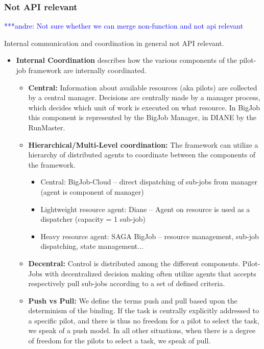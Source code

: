 \documentclass[]{article}
\newcommand{\alnote}[1]{ {\textcolor{blue} { ***andre: #1 }}}
\newcommand{\alnote}[1]{}
\begin{document}
\subsubsection{Not API relevant}
\alnote{Not sure whether we can merge non-function and not api relevant}

Internal communication and coordination in general not API relevant.

\begin{itemize}

\item \textbf{Internal Coordination} describes how the various components of the 
pilot-job framework are internally coordinated.
		\begin{itemize}
			\item \textbf{Central:} Information about available resources (aka 
			pilots) are collected by a central manager.  Decisions are centrally 
			made by a manager process, which decides which unit 
   		    of work  is executed on what resource. In BigJob 
 		    this component is  represented by the BigJob Manager, in DIANE 
 		    by the RunMaster.
 			 \item \textbf{Hierarchical/Multi-Level coordination:} The 
 			 framework can  utilize a hierarchy of distributed agents to 
 			 coordinate between the components of the framework. 
             \begin{itemize}
             	    \item Central: BigJob-Cloud -- direct dispatching of 
             	    sub-jobs from manager (agent is component of manager)
                     \item Lightweight resource agent: Diane -- Agent on 
                     resource is used as a dispatcher (capacity = 1 sub-job)
                     \item Heavy resource agent: SAGA BigJob -- resource 
                     management, sub-job dispatching, state management...
             \end{itemize}
			\item \textbf{Decentral:} Control is distributed among the 
			different components. Pilot-Jobs with decentralized decision 
			making often utilize agents that accepts respectively pull 
			sub-jobs according to a set of defined criteria.
			\item \textbf{Push vs Pull:} We define the terms push and pull 
    				based upon the determinism of the binding. If the task is 
    				centrally explicitly addressed to a specific pilot, and 
    				there is thus no freedom for a pilot to select the task, we 
    				speak of a push model. In all other situations, when there 
    				is a degree of freedom for the pilots to select a task, we 
    				speak of pull.
			

\end{itemize}
\end{itemize}
\end{document}
